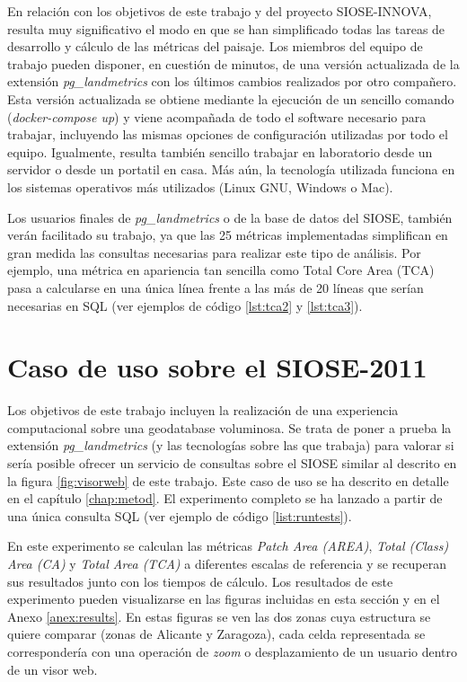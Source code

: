 En relación con los objetivos de este trabajo y del proyecto SIOSE-INNOVA, resulta muy significativo el modo en que se han simplificado todas las tareas de desarrollo y cálculo de las métricas del paisaje. Los miembros del equipo de trabajo pueden disponer, en cuestión de minutos, de una versión actualizada de la extensión \textit{pg\_landmetrics} con los últimos cambios realizados por otro compañero. Esta versión actualizada se obtiene mediante la ejecución de un sencillo comando (\textit{docker-compose up}) y viene acompañada de todo el software necesario para trabajar, incluyendo las mismas opciones de configuración utilizadas por todo el equipo. Igualmente, resulta también sencillo trabajar en laboratorio desde un servidor o desde un portatil en casa. Más aún, la tecnología utilizada funciona en los sistemas operativos más utilizados (Linux GNU, Windows o Mac). 

Los usuarios finales de \textit{pg\_landmetrics} o de la base de datos del SIOSE, también verán facilitado su trabajo, ya que las 25 métricas implementadas simplifican en gran medida las consultas necesarias para realizar este tipo de análisis. Por ejemplo, una métrica en apariencia tan sencilla como Total Core Area (TCA) pasa a calcularse en una única línea frente a las más de 20 líneas que serían necesarias en SQL (ver ejemplos de código \ref{lst:tca2} y \ref{lst:tca3}).

\section{Caso de uso sobre el SIOSE-2011 \label{sec:caso_uso}}

Los objetivos de este trabajo incluyen la realización de una experiencia computacional sobre una geodatabase voluminosa. Se trata de poner a prueba la extensión \textit{pg\_landmetrics} (y las tecnologías sobre las que trabaja) para valorar si sería posible ofrecer un servicio de consultas sobre el SIOSE similar al descrito en la figura \ref{fig:visorweb} de este trabajo. Este caso de uso se ha descrito en detalle en el capítulo \ref{chap:metod}. El experimento completo se ha lanzado a partir de una única consulta SQL (ver ejemplo de código \ref{list:runtests}).

En este experimento se calculan las métricas \textit{Patch Area (AREA)}, \textit{Total (Class) Area (CA)} y \textit{Total Area (TCA)} a diferentes escalas de referencia y se recuperan sus resultados junto con los tiempos de cálculo. Los resultados de este experimento pueden visualizarse en las figuras incluidas en esta sección y en el Anexo \ref{anex:results}. En estas figuras se ven las dos zonas cuya estructura se quiere comparar (zonas de Alicante y Zaragoza), cada celda representada se correspondería con una operación de \textit{zoom} o desplazamiento de un usuario dentro de un visor web.

